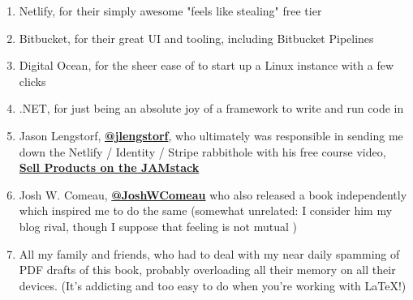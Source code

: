 \documentclass[a4paper,
                             oneside,
                             BCOR1.0cm,
                             DIV11,
                             parskip=full,
                             11pt]{scrbook}
\newcommand{\link}[2]{\textbf{\textcolor{monokaiPink}{\href{#2}{#1}}}}
\begin{document}
\begin{enumerate}
\item Netlify, for their simply awesome "feels like stealing" free tier
\item Bitbucket, for their great UI and tooling, including Bitbucket Pipelines
\item Digital Ocean, for the sheer ease of to start up a Linux instance with a few clicks
\item .NET, for just being an absolute joy of a framework to write and run code in
\item Jason Lengstorf, \link{@jlengstorf}{https://twitter.com/jlengstorf}, who ultimately was responsible in sending me down the Netlify / Identity / Stripe rabbithole with his free course video, \link{Sell Products on the JAMstack}{https://www.youtube.com/watch?v=0fQPbiqG9bY}
\item Josh W. Comeau, \link{@JoshWComeau}{https://twitter.com/JoshWComeau} who also released a book independently which inspired me to do the same (somewhat unrelated: I consider him my blog rival, though I suppose that feeling is not mutual \joy)
\item All my family and friends, who had to deal with my near daily spamming of PDF drafts of this book, probably overloading all their memory on all their devices. (It's addicting and too easy to do when you're working with LaTeX!) 
\end{enumerate}
\end{document}
